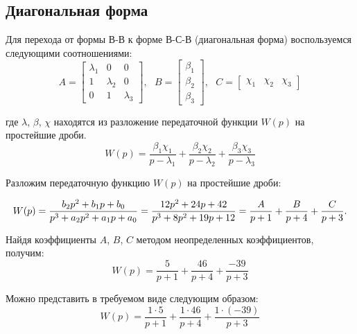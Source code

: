 \FloatBarrier
\subsection{Диагональная форма}

Для перехода от формы В-В к форме В-С-В (диагональная форма) воспользуемся следующими соотношениями:
\begin{equation}
    A = \begin{bmatrix}
        \lambda_1 & 0 & 0 \\
        1 & \lambda_2 & 0 \\
        0 & 1 & \lambda_3
    \end{bmatrix},~~~
    B = \begin{bmatrix}
        \beta_1 \\
        \beta_2 \\
        \beta_3
    \end{bmatrix},~~~
    C = \begin{bmatrix}
        \chi_1 & \chi_2 & \chi_3
    \end{bmatrix}
\end{equation}

где $\lambda$, $\beta$, $\chi$ находятся из разложение передаточной функции $W(p)$ на простейшие дроби.
\begin{equation}
    W(p) = \frac{\beta_1\chi_1}{p - \lambda_1} + \frac{\beta_2\chi_2}{p - \lambda_2} + \frac{\beta_3\chi_3}{p - \lambda_3}
\end{equation}

Разложим передаточную функцию $W(p)$ на простейшие дроби:

\begin{equation}
    W(p) = \frac{b_2 p^2 + b_1 p + b_0}{p^3 + a_2 p^2 + a_1 p + a_0} = \frac{12p^2 + 24p + 42}{p^3 + 8p^2 + 19p + 12} = \\
    \frac{A}{p + 1} + \frac{B}{p + 4} + \frac{C}{p + 3}. 
\end{equation}

Найдя коэффициенты $A$, $B$, $C$ методом неопределенных коэффициентов, получим:
\begin{equation}
    W(p) = \frac{5}{p + 1} + \frac{46}{p + 4} + \frac{-39}{p + 3}
\end{equation}

Можно представить в требуемом виде следующим образом: 
\begin{equation}
    W(p) = \frac{1 \cdot 5}{p + 1} + \frac{1 \cdot 46}{p + 4} + \frac{1 \cdot (-39)}{p + 3} 
\end{equation}

